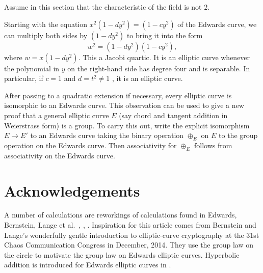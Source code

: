 \documentclass[12pt]{article}
\begin{document}
Assume in this section that the characteristic of the field is not
$2$.



Starting with the equation $x^2 (1-d y^2) = (1 - c y^2)$ of the
Edwards curve, we can multiply both sides by $(1- d y^2)$ to bring it
into the form
\[
w^2 = (1 - d y^2) (1 - c y^2),
\]
where $w = x (1 - d y^2)$.  This a Jacobi quartic.  It is an elliptic
curve whenever the polynomial in $y$ on the right-hand side has degree
four and is separable.  In particular, if $c=1$ and $d=t^2\ne 1$ , it is an
elliptic curve.

After passing to a quadratic extension if necessary, every elliptic
curve is isomorphic to an Edwards curve.  This observation can be used
to give a new proof that a general elliptic curve $E$ (say chord and
tangent addition in Weierstrass form) is a group.  To carry this out,
write the explicit isomorphism $E\to E'$ to an Edwards curve taking
the binary operation $\oplus_E$ on $E$ to the group operation on the
Edwards curve.  Then associativity for $\oplus_E$ follows from
associativity on the Edwards curve.

\section{Acknowledgements}

A number of calculations are reworkings of calculations found in
Edwards, Bernstein, Lange et al.~\cite{edwards2007normal},
\cite{bernstein2008twisted}, \cite{bernstein2007faster}.  Inspiration
for this article comes from Bernstein and Lange's wonderfully gentle
introduction to elliptic-curve cryptography at the 31st Chaos
Communication Congress in December, 2014.  They use the group law on
the circle to motivate the group law on Edwards elliptic curves.
Hyperbolic addition is introduced for Edwards elliptic curves in
\cite{arene2011faster}.  

 

\end{document}
